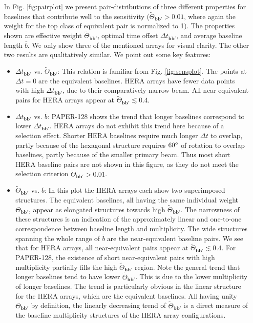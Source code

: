 \documentclass[twocolumn,apj,numberedappendix]{emulateapj}
\renewcommand\[{\begin{equation}}
\renewcommand\]{\end{equation}}
\begin{document}
In Fig. \ref{fig:pairplot} we present pair-distributions of three different properties for baselines that contribute well to the sensitivity ($\widetilde{\Theta}_{\boldsymbol{bb'}}>0.01$, where again the weight for the top class of equivalent pair is normalized to 1). The properties shown are effective weight $\widetilde{\Theta}_{\boldsymbol{bb'}}$, optimal time offset $\Delta t_{\boldsymbol{bb'}}$, and average baseline length $\bar{b}$. We only show three of the mentioned arrays for visual clarity. The other two results are qualitatively similar. We point out some key features:
\begin{itemize}

\item $\Delta t_{\boldsymbol{bb'}}$ vs. $\widetilde{\Theta}_{\boldsymbol{bb'}}$:
This relation  is familiar from Fig. \ref{fig:sensplot}. The points at $\Delta t=0$ are the equivalent baselines. HERA arrays have fewer data points with high $\Delta t_{\boldsymbol{bb'}}$, due to their comparatively narrow beam. All near-equivalent pairs for HERA arrays appear at $\widetilde{\Theta}_{\boldsymbol{bb'}}\lesssim 0.4$.

\item $\Delta t_{\boldsymbol{bb'}}$ vs. $\bar{b}$:
PAPER-128 shows the trend that longer baselines correspond to lower $\Delta t_{\boldsymbol{bb'}}$. HERA arrays do not exhibit this trend here because of a selection effect. Shorter HERA baselines require much longer $\Delta t$ to overlap, partly because of the hexagonal structure requires $60\degree$ of rotation to overlap baselines, partly because of the smaller primary beam. Thus most short HERA baseline pairs are not shown in this figure, as they do not meet the selection criterion $\widetilde{\Theta}_{\boldsymbol{bb'}}>0.01$.


\item $\widetilde{\Theta}_{\boldsymbol{bb'}}$ vs. $\bar{b}$:
In this plot the HERA arrays each show two superimposed structures.  The equivalent baselines, all having the same individual weight $\Theta_{\boldsymbol{bb'}}$, appear as elongated structures towards high $\widetilde{\Theta}_{\boldsymbol{bb'}}$. The narrowness of these structures is an indication of the approximately linear and one-to-one correspondence between baseline length and multiplicity. The wide structures spanning the whole range of $\bar{b}$ are the near-equivalent baseline pairs. We see that for HERA arrays, all near-equivalent pairs appear at $\widetilde{\Theta}_{\boldsymbol{bb'}}\lesssim 0.4$. For PAPER-128, the existence of short near-equivalent pairs with high multiplicity partially fills the high $\widetilde{\Theta}_{\boldsymbol{bb'}}$ region. 
Note the general trend that longer baselines tend to have lower $\widetilde{\Theta}_{\boldsymbol{bb'}}$. This is due to the lower multiplicity of longer baselines. The trend is particularly obvious in the linear structure for the HERA arrays, which are the equivalent baselines. All having unity $\Theta_{\boldsymbol{bb'}}$ by definition, the linearly decreasing trend of $\widetilde{\Theta}_{\boldsymbol{bb'}}$ is a direct measure of the baseline multiplicity structures of the HERA array configurations.


\end{itemize}
\end{document}

